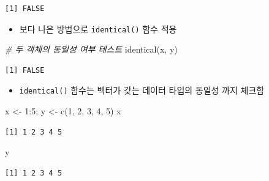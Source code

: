 \documentclass[
  11pt,
]{krantz}
\newenvironment{Shaded}{\begin{snugshade}}{\end{snugshade}}
\newcommand{\CommentTok}[1]{\textcolor[rgb]{0.37,0.37,0.37}{\textit{#1}}}
\newcommand{\DecValTok}[1]{\textcolor[rgb]{0.06,0.06,0.06}{#1}}
\newcommand{\FunctionTok}[1]{\textcolor[rgb]{0,0,0}{#1}}
\newcommand{\NormalTok}[1]{#1}
\newcommand{\OtherTok}[1]{\textcolor[rgb]{0.37,0.37,0.37}{#1}}
\newcommand{\SpecialCharTok}[1]{\textcolor[rgb]{0,0,0}{#1}}
\providecommand{\tightlist}{%
  \setlength{\itemsep}{0pt}\setlength{\parskip}{0pt}}
\begin{document}
\begin{verbatim}
[1] FALSE
\end{verbatim}

\normalsize

\begin{itemize}
\tightlist
\item
  보다 나은 방법으로 \texttt{identical()} 함수 적용
\end{itemize}

\footnotesize

\begin{Shaded}
\begin{Highlighting}[]
\CommentTok{\# 두 객체의 동일성 여부 테스트}
\FunctionTok{identical}\NormalTok{(x, y)}
\end{Highlighting}
\end{Shaded}

\begin{verbatim}
[1] FALSE
\end{verbatim}

\normalsize

\begin{itemize}
\tightlist
\item
  \texttt{identical()} 함수는 벡터가 갖는 데이터 타입의 동일성 까지 체크함
\end{itemize}

\footnotesize

\begin{Shaded}
\begin{Highlighting}[]
\NormalTok{x }\OtherTok{\textless{}{-}} \DecValTok{1}\SpecialCharTok{:}\DecValTok{5}\NormalTok{; y }\OtherTok{\textless{}{-}} \FunctionTok{c}\NormalTok{(}\DecValTok{1}\NormalTok{, }\DecValTok{2}\NormalTok{, }\DecValTok{3}\NormalTok{, }\DecValTok{4}\NormalTok{, }\DecValTok{5}\NormalTok{)}
\NormalTok{x}
\end{Highlighting}
\end{Shaded}

\begin{verbatim}
[1] 1 2 3 4 5
\end{verbatim}

\begin{Shaded}
\begin{Highlighting}[]
\NormalTok{y}
\end{Highlighting}
\end{Shaded}

\begin{verbatim}
[1] 1 2 3 4 5
\end{verbatim}
\end{document}

